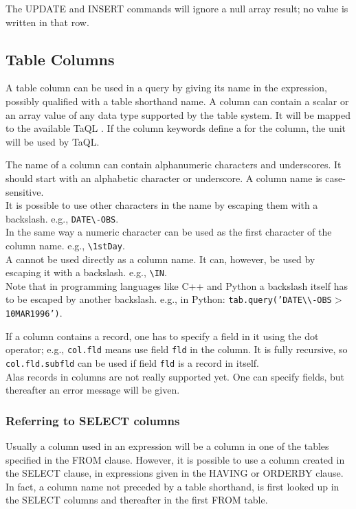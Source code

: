 The UPDATE and INSERT commands will ignore a null array result; no value
is written in that row.


\subsection{\label{TAQL:COLUMNS}Table Columns}
A table column can be used in a query by giving its name in the
expression, possibly qualified with a table shorthand name.
A column can contain a scalar or an array value of any data type
supported by the table system. It will be mapped to the available TaQL
.
If the column keywords define a  for the
column, the unit will be used by TaQL.

The name of a column can contain alphanumeric characters and underscores.
It should start with an alphabetic character or underscore.
A column name is case-sensitive.
\\It is possible to use other characters in the name by
escaping them with a backslash. e.g., \texttt{DATE}\verb+\+\texttt{-OBS}.
\\In the same way a numeric character can be used as the first
character of the column name. e.g., \verb+\+\texttt{1stDay}.
\\
A   cannot
be used directly as a column name.
It can, however, be used by escaping
it with a backslash. e.g., \verb+\+\texttt{IN}.
\\Note that in programming languages like C++ and Python a backslash
itself has to be escaped by another backslash. e.g., in Python:
\texttt{tab.query('DATE}\verb+\\+\texttt{-OBS$>$10MAR1996')}.

If a column contains a record, one has to specify a field in it
using the dot operator; e.g., \texttt{col.fld} means use field
\texttt{fld} in the column. It is fully recursive, so
\texttt{col.fld.subfld} can be used if field \texttt{fld} is a record
in itself.
\\Alas records in columns are not really supported yet. One can specify
fields, but thereafter an error message will be given.

\subsubsection{Referring to SELECT columns}
Usually a column used in an expression will be a column in one of
the tables specified in the FROM clause. However, it is possible to
use a column created in the SELECT clause, in expressions given in
the HAVING or ORDERBY clause.
In fact, a column name not preceded by a table shorthand, is first
looked up in the SELECT columns and thereafter in the first FROM table.

